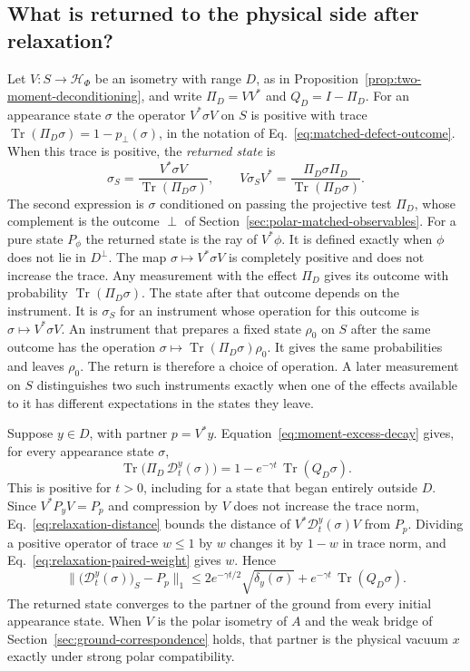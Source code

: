 \documentclass[11pt]{article}
\theoremstyle{definition}
\DeclareMathOperator{\Tr}{Tr}
\begin{document}
\subsection{What is returned to the physical side after relaxation?}
\label{subsec:relaxation-return}
Let $V:S\to\mathcal H_\Phi$ be an isometry with range $D$, as in Proposition~\ref{prop:two-moment-deconditioning}, and write $\Pi_D=VV^*$ and $Q_D=I-\Pi_D$. For an appearance state $\sigma$ the operator $V^*\sigma V$ on $S$ is positive with trace $\Tr(\Pi_D\sigma)=1-p_\perp(\sigma)$, in the notation of Eq.~\eqref{eq:matched-defect-outcome}. When this trace is positive, the \emph{returned state} is
\begin{equation}
 \sigma_S=\frac{V^*\sigma V}{\Tr(\Pi_D\sigma)},\qquad
 V\sigma_SV^*=\frac{\Pi_D\sigma\Pi_D}{\Tr(\Pi_D\sigma)} .
 \label{eq:relaxation-return}
\end{equation}
The second expression is $\sigma$ conditioned on passing the projective test $\Pi_D$, whose complement is the outcome $\perp$ of Section~\ref{sec:polar-matched-observables}. For a pure state $P_\phi$ the returned state is the ray of $V^*\phi$. It is defined exactly when $\phi$ does not lie in $D^\perp$. The map $\sigma\mapsto V^*\sigma V$ is completely positive and does not increase the trace. Any measurement with the effect $\Pi_D$ gives its outcome with probability $\Tr(\Pi_D\sigma)$. The state after that outcome depends on the instrument. It is $\sigma_S$ for an instrument whose operation for this outcome is $\sigma\mapsto V^*\sigma V$. An instrument that prepares a fixed state $\rho_0$ on $S$ after the same outcome has the operation $\sigma\mapsto\Tr(\Pi_D\sigma)\rho_0$. It gives the same probabilities and leaves $\rho_0$. The return is therefore a choice of operation. A later measurement on $S$ distinguishes two such instruments exactly when one of the effects available to it has different expectations in the states they leave.

Suppose $y\in D$, with partner $p=V^*y$. Equation~\eqref{eq:moment-excess-decay} gives, for every appearance state $\sigma$,
\begin{equation}
 \Tr\bigl(\Pi_D\,\mathcal D_t^y(\sigma)\bigr)=1-e^{-\gamma t}\,\Tr(Q_D\sigma).
 \label{eq:relaxation-paired-weight}
\end{equation}
This is positive for $t>0$, including for a state that began entirely outside $D$. Since $V^*P_yV=P_p$ and compression by $V$ does not increase the trace norm, Eq.~\eqref{eq:relaxation-distance} bounds the distance of $V^*\mathcal D_t^y(\sigma)V$ from $P_p$. Dividing a positive operator of trace $w\le1$ by $w$ changes it by $1-w$ in trace norm, and Eq.~\eqref{eq:relaxation-paired-weight} gives $w$. Hence
\begin{equation}
 \bigl\|\bigl(\mathcal D_t^y(\sigma)\bigr)_S-P_p\bigr\|_1
 \le2e^{-\gamma t/2}\sqrt{\delta_y(\sigma)}+e^{-\gamma t}\,\Tr(Q_D\sigma).
 \label{eq:relaxation-return-bound}
\end{equation}
The returned state converges to the partner of the ground from every initial appearance state. When $V$ is the polar isometry of $A$ and the weak bridge of Section~\ref{sec:ground-correspondence} holds, that partner is the physical vacuum $x$ exactly under strong polar compatibility.
\end{document}
